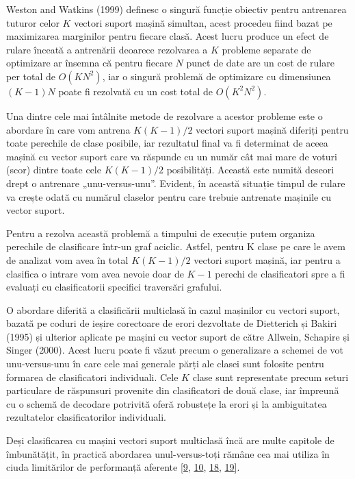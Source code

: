 Weston and Watkins (1999) definesc o singură funcție obiectiv pentru antrenarea tuturor celor $K$ vectori suport mașină simultan, acest procedeu fiind bazat pe maximizarea marginilor pentru fiecare clasă. Acest lucru produce un efect de rulare înceată a antrenării deoarece rezolvarea a $K$ probleme separate de optimizare ar însemna că pentru fiecare $N$ punct de date are un cost de rulare per total de $O(KN^2)$, iar o singură problemă de optimizare cu dimensiunea $(K - 1)N$ poate fi rezolvată cu un cost total de $O(K^2N^2)$.

Una dintre cele mai întâlnite metode de rezolvare a acestor probleme este o abordare în care vom antrena $K(K-1)/2$ vectori suport mașină diferiți pentru toate perechile de clase posibile, iar rezultatul final va fi determinat de aceea mașină cu vector suport care va răspunde cu un număr cât mai mare de voturi (scor) dintre toate cele $K(K-1)/2$ posibilități. Această este numită deseori drept o antrenare „unu-versus-unu”. Evident, în această situație timpul de rulare va crește odată cu numărul claselor pentru care trebuie antrenate mașinile cu vector suport.

Pentru a rezolva această problemă a timpului de execuție putem organiza perechile de clasificare într-un graf aciclic. Astfel, pentru K clase pe care le avem de analizat vom avea în total $K(K-1)/2$ vectori suport mașină, iar pentru a clasifica o intrare vom avea nevoie doar de $K-1$ perechi de clasificatori spre a fi evaluați cu clasificatorii specifici traversări grafului.

O abordare diferită a clasificării multiclasă în cazul mașinilor cu vectori suport, bazată pe coduri de ieșire corectoare de erori dezvoltate de Dietterich și Bakiri (1995) și ulterior aplicate pe mașini cu vector suport de către Allwein, Schapire și Singer (2000). 
Acest lucru poate fi văzut precum o generalizare a schemei de vot unu-versus-unu în care cele mai generale părți ale clasei sunt folosite pentru formarea de clasificatori individuali.
Cele $K$ clase sunt representate precum seturi particulare de răspunsuri provenite din clasificatori de două clase, iar împreună cu o schemă de decodare potrivită oferă robustețe la erori și la ambiguitatea rezultatelor clasificatorilor individuali.

Deși clasificarea cu mașini vectori suport multiclasă încă are multe capitole de îmbunătățit, în practică abordarea unul-versus-toți rămâne cea mai utiliza în ciuda limitărilor de performanță aferente \hyperlink{ErinAllweinRobertSchapireYoramSinger}{[9}, \hyperlink{JasonWestonSimonWatkins}{10}, \hyperlink{ThomasDietterichGhulumBakiri}{18}, \hyperlink{VladimirVapnik}{19]}.


